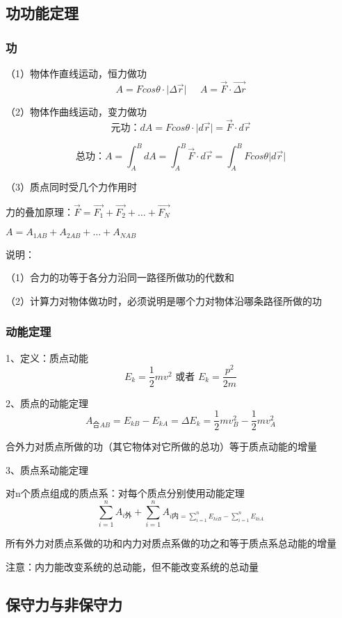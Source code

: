 \documentclass[UTF8]{article}
\begin{document}
\subsection{功\;\;功能定理}
\subsubsection{功}

    （1）物体作直线运动，恒力做功
    \[A = Fcos\theta \cdot \lvert \Delta \vec{r} \vert\;\;\;\;\;A = \vec{F}\cdot\vec{\Delta r}\]

    （2）物体作曲线运动，变力做功
    \[\mbox{元功：}dA = Fcos\theta\cdot\lvert d\vec{r}\vert = \vec{F}\cdot d\vec{r}\]

    \[\mbox{总功：}A = \int_A^BdA = \int_A^B\vec{F}\cdot d\vec{r} = \int_A^BFcos\theta \lvert d\vec{r}\vert\]

    （3）质点同时受几个力作用时

    力的叠加原理：$\vec{F} = \vec{F_1} + \vec{F_2} + \dots + \vec{F_N}$

    \;\;\;\;\;\;\;\;\;\;\;\;\;\;\;\;\;\;\;\;$A = A_{1AB} + A_{2AB} + \dots + A_{NAB}$

    说明：

    \;\;（1）合力的功等于各分力沿同一路径所做功的代数和

    \;\;（2）计算力对物体做功时，必须说明是哪个力对物体沿哪条路径所做的功

\subsubsection{动能定理}

    1、定义：质点动能\[E_k = \frac{1}{2}mv^2\mbox{ 或者 }E_k = \frac{p^2}{2m}\]

    2、质点的动能定理\[A_{\mbox{合}AB} = E_{kB} - E_{kA} = \Delta E_k = \frac{1}{2}mv_B^2 - \frac{1}{2}mv_A^2\]

    \;\;合外力对质点所做的功（其它物体对它所做的总功）等于质点动能的增量

    3、质点系动能定理

    对n个质点组成的质点系：对每个质点分别使用动能定理
    \[\sum_{i=1}^n A_{i\mbox{外}} + \sum_{i=1}^n A_{i\mbox{内} = \sum_{i=1}^n E_{kiB} - \sum_{i=1}^n E_{kiA}}\]

    所有外力对质点系做的功和内力对质点系做的功之和等于质点系总动能的增量

    注意：内力能改变系统的总动能，但不能改变系统的总动量

\subsection{保守力与非保守力}
\end{document}

